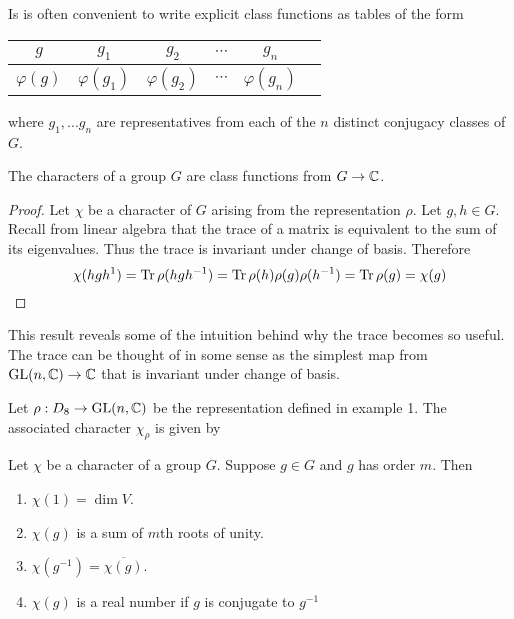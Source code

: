 Is is often convenient to write explicit class functions as tables of the form 

\begin{center}
\begin{tabular}{c|ccccc}
    $g$ & $g_1$ & $g_2$ & $\cdots$ & $g_n$  \\ \hline
    $\varphi(g)$ & $\varphi(g_1)$ & $\varphi(g_2)$ & $\cdots$ & $\varphi(g_n)$
\end{tabular}
\end{center}
where $g_1, ... g_n$ are representatives from each of the $n$ distinct conjugacy classes of $G$.




\begin{theorem}
    The characters of a group $G$ are class functions from $G \rightarrow \mathbb{C}$.
\end{theorem}

\begin{proof}
    Let $\chi$ be a character of $G$ arising from the representation $\rho$. Let $g, h \in G$. Recall from linear 
    algebra that the trace of a matrix is equivalent to the sum of its eigenvalues.  Thus the trace is invariant 
    under change of basis. Therefore
    \[
        \chi(hgh^{1}) = \text{Tr}\, \rho(hgh^{-1}) = \text{Tr}\, \rho(h) \rho(g)\rho(h^{-1}) = \text{Tr}\, \rho(g) = \chi(g)
    \]
\end{proof}

This result reveals some of the intuition behind why the trace becomes so useful. The trace can be thought of in 
some sense as the simplest map from $\operatorname{GL}(n, \mathbb{C}) \rightarrow \mathbb{C}$ that is invariant under change of basis. 

\begin{example}
    Let $\rho : D_8 \rightarrow \operatorname{GL}(n, \mathbb{C})$ be the representation defined in example 1. The associated character 
    $\chi_\rho$ is given by
    \TODO{!}
\end{example}


\begin{proposition}
    Let $\chi$ be a character of a group $G$. Suppose $g \in G$ and $g$ has order $m$. Then
    \begin{enumerate}
        \item $\chi(1) = \dim V$.
        \item $\chi(g)$ is a sum of $m$th roots of unity.
        \item $\chi(g^{-1}) = \overline{\chi(g)}$.
        \item $\chi(g)$ is a real number if $g$ is conjugate  to $g^{-1}$
    \end{enumerate}
\end{proposition}

